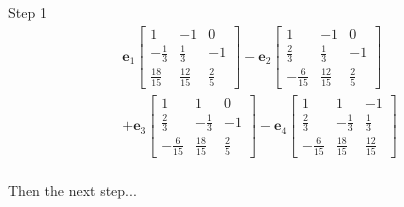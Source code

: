 \documentclass{tufte-book}
\newcommand{\vct}{\mathbf}
\theoremstyle{mytheoremstyle}
\theoremstyle{mylemstyle}
\theoremstyle{mydefstyle}
\begin{document}
\begin{enumerate}
Step 1
\begin{multline*}
\vct{e}_1
\begin{bmatrix}
1 & -1 & 0 \\
-\frac{1}{3} &\frac{1}{3} & -1 \\
\frac{18}{15} &\frac{12}{15} & \frac{2}{5}
\end{bmatrix}
-
\vct{e}_2
\begin{bmatrix}
1 & -1 & 0 \\
\frac{2}{3} &\frac{1}{3} & -1 \\
-\frac{6}{15} &\frac{12}{15} & \frac{2}{5}
\end{bmatrix}\\
+\vct{e}_3
\begin{bmatrix}
1 & 1 & 0 \\
\frac{2}{3} & -\frac{1}{3} & -1 \\
-\frac{6}{15} & \frac{18}{15} & \frac{2}{5}
\end{bmatrix}
- \vct{e}_4
\begin{bmatrix}
1 & 1 & -1 \\
\frac{2}{3} & -\frac{1}{3} &\frac{1}{3}\\
-\frac{6}{15} & \frac{18}{15} &\frac{12}{15}
\end{bmatrix} \\
\end{multline*}

Then the next step...


\end{enumerate}
\end{document}
